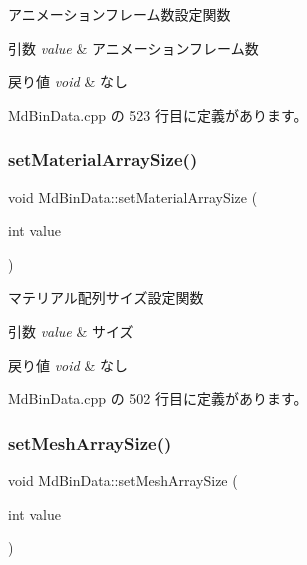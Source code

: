 アニメーションフレーム数設定関数 


\begin{DoxyParams}{引数}
{\em value} & アニメーションフレーム数 \\
\hline
\end{DoxyParams}

\begin{DoxyRetVals}{戻り値}
{\em void} & なし \\
\hline
\end{DoxyRetVals}


 Md\+Bin\+Data.\+cpp の 523 行目に定義があります。

\mbox{\label{class_md_bin_data_afe92da8866475459da756ecfb92e2683}} 
\subsubsection{\texorpdfstring{set\+Material\+Array\+Size()}{setMaterialArraySize()}}
{\footnotesize\ttfamily void Md\+Bin\+Data\+::set\+Material\+Array\+Size (\begin{DoxyParamCaption}\item[{int}]{value }\end{DoxyParamCaption})}



マテリアル配列サイズ設定関数 


\begin{DoxyParams}{引数}
{\em value} & サイズ \\
\hline
\end{DoxyParams}

\begin{DoxyRetVals}{戻り値}
{\em void} & なし \\
\hline
\end{DoxyRetVals}


 Md\+Bin\+Data.\+cpp の 502 行目に定義があります。

\mbox{\label{class_md_bin_data_aa0e9c2a5db151909fbbf0c3ef41c4e25}} 
\subsubsection{\texorpdfstring{set\+Mesh\+Array\+Size()}{setMeshArraySize()}}
{\footnotesize\ttfamily void Md\+Bin\+Data\+::set\+Mesh\+Array\+Size (\begin{DoxyParamCaption}\item[{int}]{value }\end{DoxyParamCaption})}



